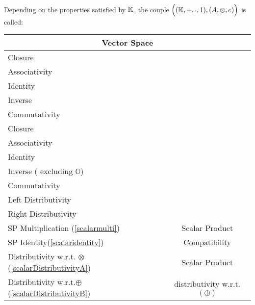\documentclass[a4paper,12pt]{scrartcl}    %
\newcommand{\OpA}{\otimes}
\newcommand{\OpB}{\oplus}
\begin{document}
\begin{landscape}
\begin{minipage}[c][\textheight]{0.60 \linewidth}
			
			Depending on the properties satisfied by $\mathbb{K}$, the couple $\Big((\KField,+,\cdot,1),(A,\OpA,e)\Big)$ is called:
		\vfill
	\end{minipage}
	\hspace{1cm}
	\begin{minipage}[t][]{0.40 \linewidth}
		\begin{minipage}[c]{1\textwidth}	
			\begin{tabular}{|l|c|} %
			  \hline
			  \multicolumn{2}{|c|}{\cellcolor{blue!25}Vector Space} \\
			  \hline
			    \cellcolor{green!25} \footnotesize Closure& \cellcolor{yellow!25}  \\
			    \cellcolor{green!25} \footnotesize Associativity& \cellcolor{yellow!25}  \\
			    \cellcolor{green!25} \footnotesize Identity& \cellcolor{yellow!25} \\
			    \cellcolor{green!25} \footnotesize Inverse& \cellcolor{yellow!25} \\
			    \cellcolor{green!25} \footnotesize Commutativity & \cellcolor{yellow!25} \\
			    \cellcolor{green!25} \footnotesize Closure& \cellcolor{yellow!25}  \\
			    \cellcolor{green!25} \footnotesize Associativity& \cellcolor{yellow!25}  \\
			    \cellcolor{green!25} \footnotesize Identity& \cellcolor{yellow!25} \\
			    \cellcolor{orange!25} \footnotesize Inverse \tiny( excluding $\mathbb{O}$)& \cellcolor{yellow!25} \\
			    \cellcolor{green!25} \footnotesize Commutativity& \cellcolor{yellow!25} \\
			  	\cellcolor{green!25} \footnotesize Left Distributivity&  \cellcolor{yellow!25} \\
			    \cellcolor{green!25} \footnotesize Right Distributivity & \tiny\cellcolor{yellow!25} \multirow{-12}{*}{\tiny \rotatebox[origin=c]{90}{Field $(\KField,+,\cdot,1)$})}  \\
			   \hline
			  \hline
			     \cellcolor{green!25} \footnotesize SP Multiplication (\ref{scalarmulti})&  \tiny\cellcolor{yellow!25}Scalar Product\\
			    \cellcolor{green!25} \footnotesize SP Identity(\ref{scalaridentity}) & \tiny\cellcolor{yellow!25} Compatibility  \\
			   \hline 
			    \cellcolor{green!25} \footnotesize Distributivity w.r.t. $\OpA$ (\ref{scalarDistributivityA})&  \tiny\cellcolor{yellow!25}Scalar Product\\
			    \cellcolor{green!25} \footnotesize Distributivity w.r.t.$\OpB$ (\ref{scalarDistributivityB}) & \tiny\cellcolor{yellow!25} distributivity w.r.t. $\big(\OpB\big)$  \\
			   \hline
			\end{tabular}
			

\end{minipage}
\end{minipage}
\end{landscape}
\end{document}
